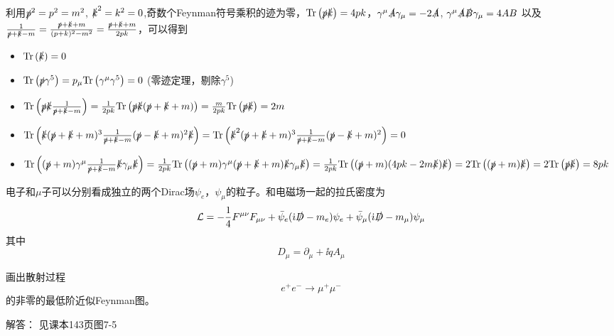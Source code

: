 \documentclass[CJK]{beamer}
\begin{document}
\begin{frame}
\bch
{\tiny
利用$\slashed{p}^2 = p^2 = m^2$, $\slashed{k}^2 = k^2 = 0$,奇数个Feynman符号乘积的迹为零，$\mathrm{Tr}\left(\slashed{p}\slashed{k}\right) = 4pk$，$\gamma^\mu\slashed{A}\gamma_\mu = -2\slashed{A}$, $\gamma^\mu\slashed{A}\slashed{B}\gamma_\mu = 4 AB$ 以及$\frac{1}{\slashed{p}+\slashed{k}-m} = \frac{\slashed{p}+\slashed{k}+m}{(p+k)^2-m^2} = \frac{\slashed{p}+\slashed{k}+m}{2pk}$，可以得到
\begin{itemize}
\item{$\mathrm{Tr}\left(\slashed{k}\right) = 0$  }
\item{$\mathrm{Tr}\left(\slashed{p}\gamma^5\right) = p_\mu\mathrm{Tr}\left(\gamma^\mu\gamma^5\right) = 0$ (零迹定理，剔除$\gamma^5$) }
\item{$\mathrm{Tr}\left(\slashed{p}\slashed{k} \frac{1}{\slashed{p}+\slashed{k}-m}\right) = \frac{1}{2pk}\mathrm{Tr}\left(\slashed{p}\slashed{k}(\slashed{p}+\slashed{k}+m)\right) = \frac{m}{2pk}\mathrm{Tr}\left(\slashed{p}\slashed{k}\right) = 2m$}
\item{$\mathrm{Tr}\left(\slashed{k}(\slashed{p}+\slashed{k}+m)^3\frac{1}{\slashed{p}+\slashed{k}-m}(\slashed{p}-\slashed{k}+m)^2\slashed{k}\right) = \mathrm{Tr}\left(\slashed{k}^2(\slashed{p}+\slashed{k}+m)^3\frac{1}{\slashed{p}+\slashed{k}-m}(\slashed{p}-\slashed{k}+m)^2\right) = 0$}
\item{$\mathrm{Tr}\left((\slashed{p}+m)\gamma^\mu\frac{1}{\slashed{p}+\slashed{k} -m}\slashed{k}\gamma_\mu\slashed{k}\right) = \frac{1}{2pk} \mathrm{Tr}\left((\slashed{p}+m)\gamma^\mu(\slashed{p}+\slashed{k} + m)\slashed{k}\gamma_\mu\slashed{k}\right) =  \frac{1}{2pk} \mathrm{Tr}\left((\slashed{p}+m) (4pk - 2m\slashed{k}) \slashed{k}\right) = 2 \mathrm{Tr}\left((\slashed{p}+m)\slashed{k} \right)  =2 \mathrm{Tr}\left(\slashed{p}\slashed{k} \right) = 8 pk $ }
\end{itemize}
}
\ech
\end{frame}

\begin{frame}
\bch
{\scriptsize
电子和$\mu$子可以分别看成独立的两个Dirac场$\psi_e$，$\psi_\mu$的粒子。和电磁场一起的拉氏密度为
$${\mathcal{L}} = -\frac{1}{4}{F^{\mu\nu}}{F_{\mu\nu}} + \bar{\psi}_e({\dot{\imath}} \slashed{D} - m_e)\psi_e + \bar{\psi}_\mu({\dot{\imath}} \slashed{D} - m_\mu)\psi_\mu$$
其中
$$ D_\mu = \partial_\mu + \ii q A_\mu$$

画出散射过程
$$e^+e^- \rightarrow \mu^+\mu^-$$
的非零的最低阶近似Feynman图。

\skipline

解答： 见课本143页图7-5
}


\ech
\end{frame}
\end{document}
